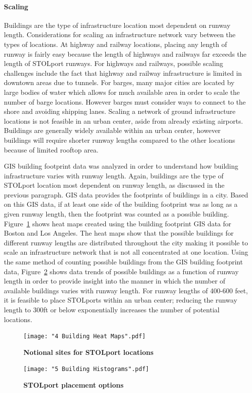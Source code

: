 \documentclass[]{aiaa-tc}%
\begin{document}
\paragraph{Scaling}
Buildings are the type of infrastructure location most dependent on runway length. Considerations for scaling an infrastructure network vary between the types of locations. At highway and railway locations, placing any length of runway is fairly easy because the length of highways and railways far exceeds the length of STOLport runways. For highways and railways, possible scaling challenges include the fact that highway and railway infrastructure is limited in downtown areas due to tunnels. For barges, many major cities are located by large bodies of water which allows for much available area in order to scale the number of barge locations. However barges must consider ways to connect to the shore and avoiding shipping lanes. Scaling a network of ground infrastructure locations is not  feasible in an urban center, aside from already existing airports. Buildings are generally widely available within an urban center, however buildings will require shorter runway lengths compared to the other locations because of limited rooftop area. 

	GIS building footprint data was analyzed in order to understand how building infrastructure varies with runway length. Again, buildings are the type of STOLport location most dependent on runway length, as discussed in the previous paragraph. GIS data provides the footprints of buildings in a city\cite{GIS_MA}\cite{GIS_CA}. Based on this GIS data, if at least one side of the building footprint was as long as a given runway length, then the footprint was counted as a possible building. Figure~\ref{f:heatmap} shows heat maps created using the building footprint GIS data for Boston and Los Angeles. The heat maps show that the possible buildings for different runway lengths are distributed throughout the city making it possible to scale an infrastructure network that is not all concentrated at one location. Using the same method of counting possible buildings from the GIS building footprint data, Figure~\ref{f:hist} shows data trends of possible buildings as a function of runway length in order to provide insight into the manner in which the number of available buildings varies with runway length. For runway lengths of 400-600 feet, it is feasible to place STOLports within an urban center; reducing the runway length to 300ft or below exponentially increases the number of potential locations. 
\begin{figure}[h!]
	\begin{center}
	\texttt{[image: "4 Building Heat Maps".pdf]}
    \caption{\textbf{Notional sites for STOLport locations}}
	\label{f:heatmap}
	\end{center}
\end{figure}
\begin{figure}[h!]
	\begin{center}
	\texttt{[image: "5 Building Histograms".pdf]}
    \caption{\textbf{STOLport placement options}}
	\label{f:hist}
	\end{center}
\end{figure}
\end{document}
